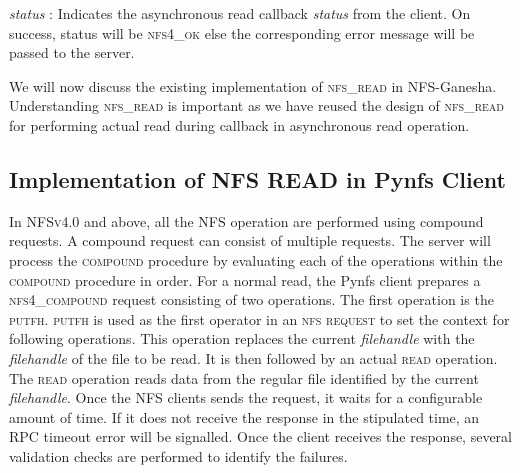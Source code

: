 \noindent\textit{status} : Indicates the asynchronous read callback \textit{status} from the client. On success, status will be \textsc{nfs4\_ok} else the corresponding error message will be passed to the server.



We will now discuss the existing implementation of \textsc{nfs\_read} in NFS-Ganesha. Understanding \textsc{nfs\_read} is important as we have reused the design of \textsc{nfs\_read} for performing actual read during callback in asynchronous read operation.


\subsection{Implementation of NFS READ in Pynfs Client}
 
In \textsc{NFSv4.0} and above, all the NFS operation are performed using compound requests. A compound request can consist of multiple requests. The server will process the \textsc{compound} procedure by evaluating each of the operations within the \textsc{compound} procedure in order. For a normal read, the Pynfs client prepares a \textsc{nfs4\_compound} request consisting of two operations. The first operation is the \textsc{putfh}. \textsc{putfh} is used as the first operator in an \textsc{nfs request} to set the context for following operations. This operation replaces the current \textit{filehandle} with the \textit{filehandle} of the file to be read. It is then followed by an actual \textsc{read} operation. The \textsc{read} operation reads data from the regular file identified by the current \textit{filehandle}. Once the NFS clients sends the request, it waits for a configurable amount of time. If it does not receive the response in the stipulated time, an RPC timeout error will be signalled. Once the client receives the response, several validation checks are performed to identify the failures.

